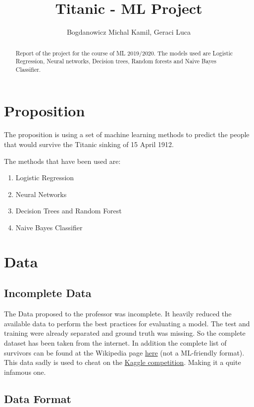 \documentclass{article}
\begin{document}
\title{Titanic - ML Project}
\author{Bogdanowicz Michal Kamil, Geraci Luca}

\maketitle

\begin{abstract}
Report of the project for the course of ML 2019/2020.
\break The models used are Logistic Regression, Neural networks, Decision trees, Random forests and Naive Bayes Classifier.
\end{abstract}


\section{Proposition}
The proposition is using a set of machine learning methods to predict the people that would survive the Titanic sinking of 15 April 1912.

The methods that have been used are:

\begin{enumerate}  
\item Logistic Regression
\item Neural Networks
\item Decision Trees and Random Forest
\item Naive Bayes Classifier
\end{enumerate}

\section{Data}
\subsection{Incomplete Data}

The Data proposed to the professor was incomplete. It heavily reduced the available data to perform the best practices for evaluating a model. The test and training were already separated and ground truth was missing. So the complete dataset has been taken from the internet. In addition the complete list of survivors can be found at the Wikipedia page \href{https://en.wikipedia.org/wiki/Passengers_of_the_RMS_Titanic}{here} (not a ML-friendly format).
This data sadly is used to cheat on the  \href{https://www.kaggle.com/c/titanic/leaderboard}{Kaggle competition}. Making it a quite infamous one.

\subsection{Data Format}
\end{document}

